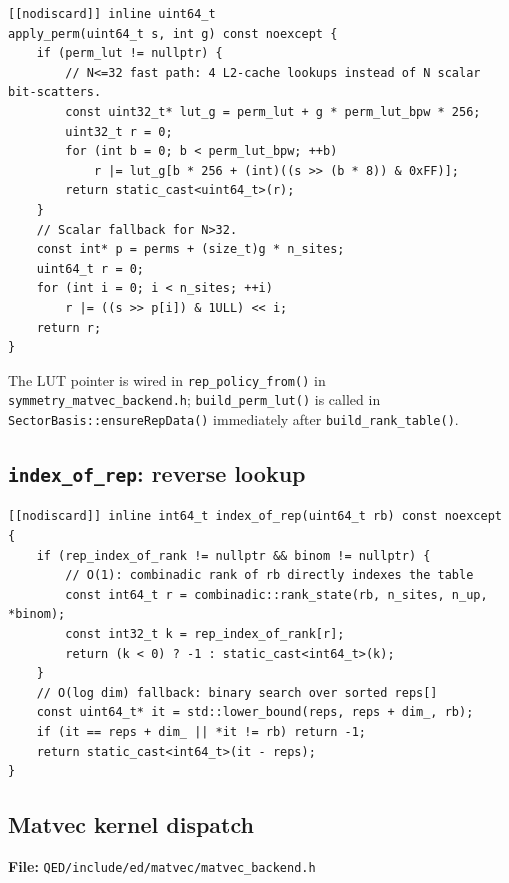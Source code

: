 \documentclass[11pt,a4paper]{article}
\begin{document}
\begin{lstlisting}[caption={Fast apply\_perm using LUT (rep\_symmetry\_basis\_policy.h)}]
[[nodiscard]] inline uint64_t
apply_perm(uint64_t s, int g) const noexcept {
    if (perm_lut != nullptr) {
        // N<=32 fast path: 4 L2-cache lookups instead of N scalar bit-scatters.
        const uint32_t* lut_g = perm_lut + g * perm_lut_bpw * 256;
        uint32_t r = 0;
        for (int b = 0; b < perm_lut_bpw; ++b)
            r |= lut_g[b * 256 + (int)((s >> (b * 8)) & 0xFF)];
        return static_cast<uint64_t>(r);
    }
    // Scalar fallback for N>32.
    const int* p = perms + (size_t)g * n_sites;
    uint64_t r = 0;
    for (int i = 0; i < n_sites; ++i)
        r |= ((s >> p[i]) & 1ULL) << i;
    return r;
}
\end{lstlisting}

The LUT pointer is wired in \texttt{rep\_policy\_from()} in
\texttt{symmetry\_matvec\_backend.h}; \texttt{build\_perm\_lut()} is called
in \texttt{SectorBasis::ensureRepData()} immediately after
\texttt{build\_rank\_table()}.

\subsection{\texttt{index\_of\_rep}: reverse lookup}

\begin{lstlisting}[caption={O(1) vs O(log dim) reverse lookup}]
[[nodiscard]] inline int64_t index_of_rep(uint64_t rb) const noexcept {
    if (rep_index_of_rank != nullptr && binom != nullptr) {
        // O(1): combinadic rank of rb directly indexes the table
        const int64_t r = combinadic::rank_state(rb, n_sites, n_up, *binom);
        const int32_t k = rep_index_of_rank[r];
        return (k < 0) ? -1 : static_cast<int64_t>(k);
    }
    // O(log dim) fallback: binary search over sorted reps[]
    const uint64_t* it = std::lower_bound(reps, reps + dim_, rb);
    if (it == reps + dim_ || *it != rb) return -1;
    return static_cast<int64_t>(it - reps);
}
\end{lstlisting}

\subsection{Matvec kernel dispatch}

\textbf{File:} \texttt{QED/include/ed/matvec/matvec\_backend.h}
\end{document}
